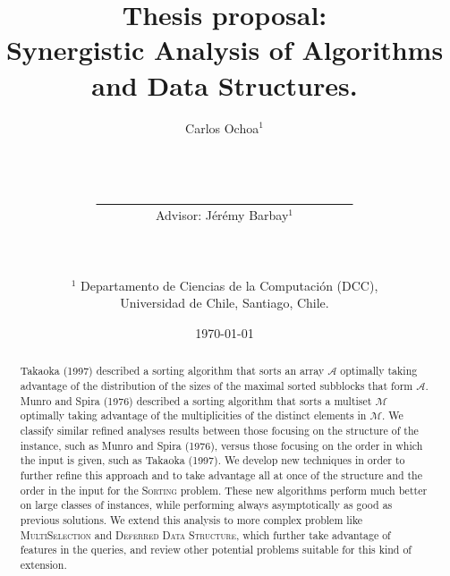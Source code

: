 \documentclass[10pt]{article}
\title{Thesis proposal: \\Synergistic Analysis of Algorithms and Data Structures.}
\author{Carlos Ochoa$^{1}$
  \\\\\\\\\underline{\ \ \ \ \ \ \ \ \ \ \ \ \ \ \ \ \ \ \ \ \ \ \ \ \
    \ \ \ \ \ \ \ \ \ \ \ \ \ \ \ \ }
  \\Advisor: J\'er\'emy Barbay$^1$\\\\\\\\
  $^1$ Departamento de Ciencias de la Computaci\'on (DCC),\\ Universidad de Chile, Santiago, Chile.
}
\date{\today}
\begin{document}
\maketitle
\begin{abstract}
  Takaoka (1997) described a sorting algorithm that sorts an array
  $\mathcal{A}$ optimally taking advantage of the distribution of the
  sizes of the maximal sorted subblocks that form $\mathcal{A}$. Munro
  and Spira (1976) described a sorting algorithm that sorts a multiset
  $\mathcal{M}$ optimally taking advantage of the multiplicities of
  the distinct elements in $\mathcal{M}$. We classify similar refined
  analyses results between those focusing on the structure of the
  instance, such as Munro and Spira (1976), versus those focusing on
  the order in which the input is given, such as Takaoka (1997). We
  develop new techniques in order to further refine this approach and
  to take advantage all at once of the structure and the order in the
  input for the \textsc{Sorting} problem. These new algorithms perform
  much better on large classes of instances, while performing always
  asymptotically as good as previous solutions. We extend this
  analysis to more complex problem like \textsc{MultiSelection} and
  \textsc{Deferred Data Structure}, which further take advantage of
  features in the queries, and review other potential problems suitable
  for this kind of extension.
\end{abstract}
\clearpage





\end{document}
